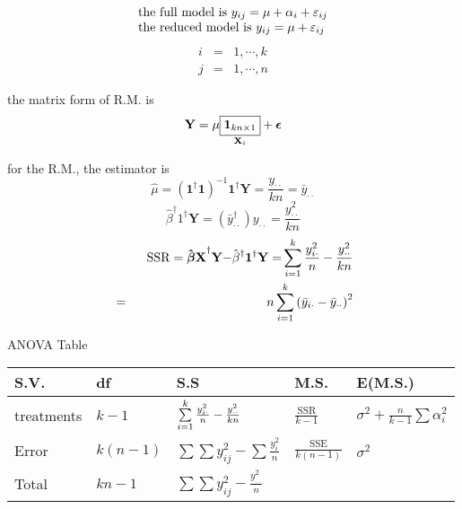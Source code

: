 \documentclass{article}
\begin{document}
\begin{equation*}
\begin{tabular}{l}
the full model is $y_{ij}=\mu +\alpha _{i}+\varepsilon _{ij}$ \\ 
the reduced model is $y_{ij}=\mu +\varepsilon _{ij}$%
\end{tabular}%
\end{equation*}%
\begin{eqnarray*}
i &=&1,\cdots ,k \\
j &=&1,\cdots ,n
\end{eqnarray*}

\bigskip 

the matrix form of R.M. is%
\begin{equation*}
\mathbf{Y}=\mu \underset{\mathbf{X}_{i}}{\fbox{$\mathbf{1}_{kn\times 1}$}}+%
\mathbf{\epsilon }
\end{equation*}

for the R.M., the estimator is%
\begin{equation*}
\hat{\mu}=\left( \mathbf{1}^{\dagger }\mathbf{1}\right) ^{-1}\mathbf{1}%
^{\dagger }\mathbf{Y}=\frac{y_{\cdot \cdot }}{kn}=\bar{y}_{\cdot \cdot }
\end{equation*}%
\begin{equation*}
\hat{\beta}^{\dagger }1^{\dagger }\mathbf{Y=}\left( \bar{y}_{\cdot \cdot
}^{\dagger }\right) y_{\cdot \cdot }=\frac{y_{\cdot \cdot }^{2}}{kn}
\end{equation*}%
\begin{eqnarray*}
&\therefore &\text{SSR}=\mathbf{\hat{\beta}X}^{\dagger }\mathbf{Y-}\hat{\beta%
}^{\dagger }\mathbf{1}^{\dagger }\mathbf{Y=}\sum\limits_{i=1}^{k}\frac{%
y_{i\cdot }^{2}}{n}-\frac{y_{\cdot \cdot }^{2}}{kn} \\
&=&n\sum\limits_{i=1}^{k}\left( \bar{y}_{i\cdot }-\bar{y}_{\cdot \cdot
}\right) ^{2}
\end{eqnarray*}

\bigskip

ANOVA Table

\bigskip

\begin{tabular}{lllll}
S.V. & df & S.S & M.S. & E(M.S.) \\ \hline
treatments & $k-1$ & $\sum\limits_{i=1}^{k}\frac{y_{i\cdot }^{2}}{n}-\frac{%
y_{\cdot \cdot }^{2}}{kn}$ & $\frac{\text{SSR}}{k-1}$ & $\sigma ^{2}+\frac{n%
}{k-1}\sum \alpha _{i}^{2}$ \\ 
Error & $k\left( n-1\right) $ & $\sum \sum y_{ij}^{2}-\sum \frac{y_{i}^{2}}{n%
}$ & $\frac{\text{SSE}}{k\left( n-1\right) }$ & $\sigma ^{2}$ \\ 
Total & $kn-1$ & $\sum \sum y_{ij}^{2}-\frac{y_{\cdot \cdot }^{2}}{n}$ &  & 
\end{tabular}
\end{document}
